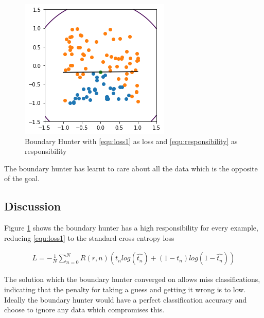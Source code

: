 \documentclass[notitlepage]{report}
\theoremstyle{definition}
\begin{document}
\begin{figure}[H]
\centering
  \begin{minipage}[b]{0.4\textwidth}
    \includegraphics[width=\textwidth]{BoundaryHunter-Attempt1-01.png}
    \caption{Boundary Hunter with \ref{equ:loss1} as loss and \ref{equ:responsibility} as responsibility}
    \label{fig:boundaryhunter-l1-01}
  \end{minipage}
  \hfill
\end{figure}

The boundary hunter has learnt to care about all the data which is the opposite of the goal.

\subsection{Discussion}
Figure \ref{fig:boundaryhunter-l1-01} shows the boundary hunter has a high responsibility for every example, reducing \ref{equ:loss1} to the standard cross entropy loss

\begin{align*}
L = -\frac{1}{N} \sum_{n=0}^N R(r, n) (t_n log(\widehat{t_n}) + (1-t_n)log(1 - \widehat{t_n}))
\end{align*} 

The solution which the boundary hunter converged on allows miss classifications, indicating that the penalty for taking a guess and getting it wrong is to low. Ideally the boundary hunter would have a perfect classification accuracy and choose to ignore any data which compromises this.
\end{document}
